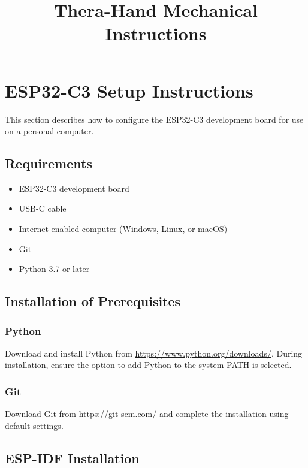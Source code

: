 \documentclass[conference]{IEEEtran}
\begin{document}
\title{Thera-Hand Mechanical Instructions}
\author{
}
\maketitle

\section{ESP32-C3 Setup Instructions}

This section describes how to configure the ESP32-C3 development board for use on a personal computer.

\subsection{Requirements}
\begin{itemize}
    \item ESP32-C3 development board
    \item USB-C cable
    \item Internet-enabled computer (Windows, Linux, or macOS)
    \item Git
    \item Python 3.7 or later
\end{itemize}

\subsection{Installation of Prerequisites}

\subsubsection{Python}
Download and install Python from \url{https://www.python.org/downloads/}. During installation, ensure the option to add Python to the system PATH is selected.

\subsubsection{Git}
Download Git from \url{https://git-scm.com/} and complete the installation using default settings.

\subsection{ESP-IDF Installation}
\end{document}
